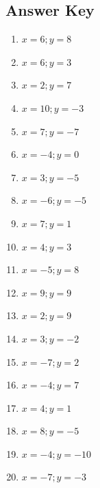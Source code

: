 \documentclass{article}
\begin{document}
\newpage

\subsection*{Answer Key}

\begin{enumerate}
\item $\displaystyle x = 6 ; y = 8 $ \ 
\item $\displaystyle x = 6 ; y = 3 $ \ 
\item $\displaystyle x = 2 ; y = 7 $ \ 
\item $\displaystyle x = 10 ; y = -3 $ \ 
\item $\displaystyle x = 7 ; y = -7 $ \ 
\item $\displaystyle x = -4 ; y = 0 $ \ 
\item $\displaystyle x = 3 ; y = -5 $ \ 
\item $\displaystyle x = -6 ; y = -5 $ \ 
\item $\displaystyle x = 7 ; y = 1 $ \ 
\item $\displaystyle x = 4 ; y = 3 $ \ 
\item $\displaystyle x = -5 ; y = 8 $ \ 
\item $\displaystyle x = 9 ; y = 9 $ \ 
\item $\displaystyle x = 2 ; y = 9 $ \ 
\item $\displaystyle x = 3 ; y = -2 $ \ 
\item $\displaystyle x = -7 ; y = 2 $ \ 
\item $\displaystyle x = -4 ; y = 7 $ \ 
\item $\displaystyle x = 4 ; y = 1 $ \ 
\item $\displaystyle x = 8 ; y = -5 $ \ 
\item $\displaystyle x = -4 ; y = -10 $ \ 
\item $\displaystyle x = -7 ; y = -3 $ \ 

\end{enumerate}
\end{document}
